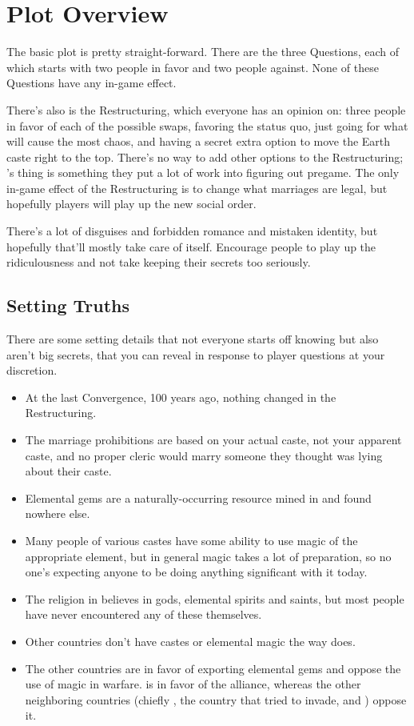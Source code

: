 \documentclass[sheet]{iron}
\begin{document}
\section{Plot Overview}

The basic plot is pretty straight-forward.  There are the three Questions,
each of which starts with two people in favor and two people against.
None of these Questions have any in-game effect.

There's also is the Restructuring, which everyone has an opinion on:
three people in favor of each of the possible swaps,
\cFakePriest{\full} favoring the status quo, \cTrickster{\full} just
going for what will cause the most chaos, and \cRoyalty{\full} having
a secret extra option to move the Earth caste right to the top.
There's no way to add other options to the Restructuring;
\cRoyalty{}'s thing is something they put a lot of work into figuring
out pregame.  The only in-game effect of the Restructuring is to
change what marriages are legal, but hopefully players will play up
the new social order.

There's a lot of disguises and forbidden romance and mistaken
identity, but hopefully that'll mostly take care of itself.  Encourage
people to play up the ridiculousness and not take keeping their
secrets too seriously.

\subsection{Setting Truths}

There are some setting details that not everyone starts off knowing but
also aren't big secrets, that you can reveal in response to player questions
at your discretion.

\begin{itemize}
\item At the last Convergence, 100 years ago, nothing changed in the
  Restructuring.
\item The marriage prohibitions are based on your actual caste, not
  your apparent caste, and no proper cleric would marry someone they
  thought was lying about their caste.
\item Elemental gems are a naturally-occurring resource mined in \sHomeCountry{}
  and found nowhere else.
\item Many people of various castes have some ability to use magic of the
  appropriate element, but in general magic takes a lot of preparation,
  so no one's expecting anyone to be doing anything significant with it today.
\item The religion in \sHomeCountry{} believes in gods, elemental spirits
  and saints, but most people have never encountered any of these themselves.
\item Other countries don't have castes or elemental magic the way \sHomeCountry{} does.
\item The other countries are in favor of \sHomeCountry{} exporting elemental gems and oppose the use of magic in warfare.  \sTreatyCountry{} is in favor of the alliance, whereas the other neighboring countries (chiefly \sMulanCountry{}, the country that tried to invade, and \sSpyCountry{}) oppose it.
\end{itemize}
\end{document}
